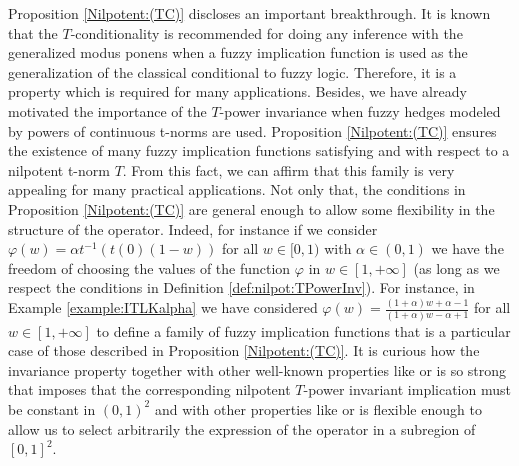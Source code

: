 Proposition \ref{Nilpotent:(TC)} discloses an important breakthrough. It is known that the $T$-conditionality is recommended for doing any inference with the generalized modus ponens when a fuzzy implication function is used as the generalization of the classical conditional to fuzzy logic. Therefore, it is a property which is required for many applications. Besides, we have already motivated the importance of the $T$-power invariance when fuzzy hedges modeled by powers of continuous t-norms are used. Proposition \ref{Nilpotent:(TC)} ensures the existence of many fuzzy implication functions satisfying \PIT and \TC with respect to a nilpotent t-norm $T$. From this fact, we can affirm that this family is very appealing for many practical applications. Not only that, the conditions in Proposition \ref{Nilpotent:(TC)} are general enough to allow some flexibility in the structure of the operator. Indeed, for instance if we consider $\varphi(w)= \alpha t^{-1}(t(0)(1-w))$ for all $w \in [0,1)$ with $\alpha \in (0,1)$ we have the freedom of choosing the values of the function $\varphi$ in  $w \in [1,+\infty]$ (as long as we respect the conditions in Definition \ref{def:nilpot:TPowerInv}). For instance, in Example \ref{example:ITLKalpha} we have considered $\varphi(w)=\frac{(1+\alpha)w+\alpha-1}{(1+\alpha)w-\alpha+1}$ for all  $w \in [1,+\infty]$ to define a family of fuzzy implication functions that is a particular case of those described in Proposition \ref{Nilpotent:(TC)}. It is curious how the invariance property together with other well-known properties like \NP or \LI is so strong that imposes that the corresponding nilpotent $T$-power invariant implication must be constant in $(0,1)^2$ and with other properties like \TC or \EP is flexible enough to allow us to select arbitrarily the expression of the operator in a subregion of $[0,1]^2$.
